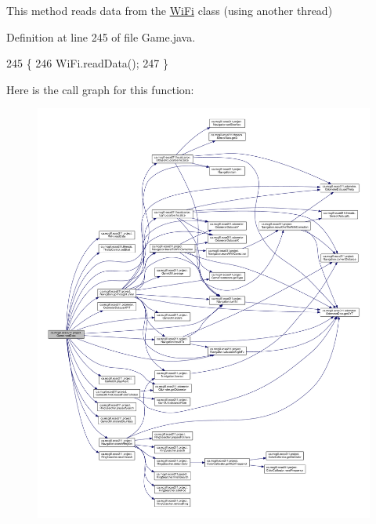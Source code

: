 This method reads data from the \hyperlink{enumca_1_1mcgill_1_1ecse211_1_1project_1_1_wi_fi}{Wi\+Fi} class (using another thread) 

Definition at line 245 of file Game.\+java.


\begin{DoxyCode}
245                          \{
246     WiFi.readData();
247   \}
\end{DoxyCode}
Here is the call graph for this function\+:
\nopagebreak
\begin{figure}[H]
\begin{center}
\leavevmode
\includegraphics[width=350pt]{enumca_1_1mcgill_1_1ecse211_1_1project_1_1_game_a032b53e9b16b9d470b461de4a311a698_cgraph}
\end{center}
\end{figure}
\mbox{\label{enumca_1_1mcgill_1_1ecse211_1_1project_1_1_game_a5b304a6a59ddee3f8c7d37bba8a4c129}} 
